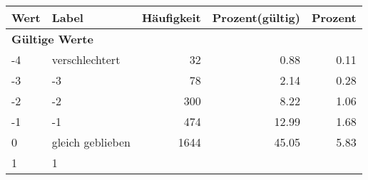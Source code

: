      \begin{longtable}{lXrrr}
     \toprule
     \textbf{Wert} & \textbf{Label} & \textbf{Häufigkeit} & \textbf{Prozent(gültig)} & \textbf{Prozent} \\
     \endhead
     \midrule
     \multicolumn{5}{l}{\textbf{Gültige Werte}}\\

     -4 &
     \multicolumn{1}{X}{ verschlechtert   } &


       \num{32} &
       \num[round-mode=places,round-precision=2]{0,88} &
         \num[round-mode=places,round-precision=2]{0,11} \\

     -3 &
     \multicolumn{1}{X}{ -3   } &


       \num{78} &
       \num[round-mode=places,round-precision=2]{2,14} &
         \num[round-mode=places,round-precision=2]{0,28} \\

     -2 &
     \multicolumn{1}{X}{ -2   } &


       \num{300} &
       \num[round-mode=places,round-precision=2]{8,22} &
         \num[round-mode=places,round-precision=2]{1,06} \\

     -1 &
     \multicolumn{1}{X}{ -1   } &


       \num{474} &
       \num[round-mode=places,round-precision=2]{12,99} &
         \num[round-mode=places,round-precision=2]{1,68} \\

     0 &
     \multicolumn{1}{X}{ gleich geblieben   } &


       \num{1644} &
       \num[round-mode=places,round-precision=2]{45,05} &
         \num[round-mode=places,round-precision=2]{5,83} \\

     1 &
     \multicolumn{1}{X}{ 1   } &



\end{longtable}
